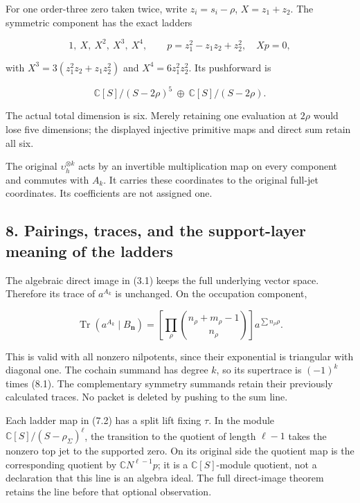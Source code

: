 \documentclass[
]{article}
\begin{document}
For one order-three zero taken twice, write \(z_i=s_i-\rho\),
\(X=z_1+z_2\). The symmetric component has the exact ladders

\[1,\ X,\ X^2,\ X^3,\ X^4,\qquad
p=z_1^2-z_1z_2+z_2^2,\quad Xp=0,\tag{7.7}\]

with \(X^3=3(z_1^2z_2+z_1z_2^2)\) and \(X^4=6z_1^2z_2^2\). Its
pushforward is

\[\mathbb C[S]/(S-2\rho)^5\ \oplus\ \mathbb C[S]/(S-2\rho).\tag{7.8}\]

The actual total dimension is six. Merely retaining one evaluation at
\(2\rho\) would lose five dimensions; the displayed injective primitive
maps and direct sum retain all six.

The original \(\upsilon_h^{\otimes k}\) acts by an invertible
multiplication map on every component and commutes with \(A_k\). It
carries these coordinates to the original full-jet coordinates. Its
coefficients are not assigned one.

\subsection{8. Pairings, traces, and the support-layer meaning of the
ladders}\label{pairings-traces-and-the-support-layer-meaning-of-the-ladders}

The algebraic direct image in (3.1) keeps the full underlying vector
space. Therefore its trace of \(a^{A_k}\) is unchanged. On the
occupation component,

\[\operatorname{Tr}(a^{A_k}\mid B_{\mathbf n})
=\left[\prod_\rho\binom{n_\rho+m_\rho-1}{n_\rho}\right]
 a^{\sum n_\rho\rho}.\tag{8.1}\]

This is valid with all nonzero nilpotents, since their exponential is
triangular with diagonal one. The cochain summand has degree \(k\), so
its supertrace is \((-1)^k\) times (8.1). The complementary symmetry
summands retain their previously calculated traces. No packet is deleted
by pushing to the sum line.

Each ladder map in (7.2) has a split lift fixing \(\tau\). In the module
\(\mathbb C[S]/(S-\rho_\Sigma)^\ell\), the transition to the quotient of
length \(\ell-1\) takes the nonzero top jet to the supported zero. On
its original side the quotient map is the corresponding quotient by
\(\mathbb C N^{\ell-1}p\); it is a \(\mathbb C[S]\)-module quotient, not
a declaration that this line is an algebra ideal. The full direct-image
theorem retains the line before that optional observation.
\end{document}
